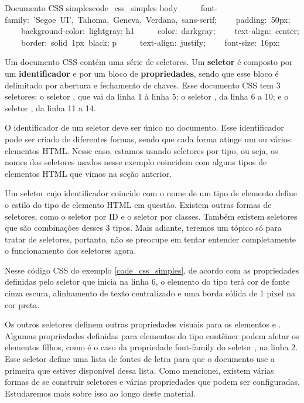 \begin{csscode}{Documento CSS simples}{code_css_simples}
body {
    font-family: 'Segoe UI', Tahoma, Geneva, Verdana, sans-serif;
    padding: 50px;
    background-color: lightgray;
}
h1 {
    color: darkgray;
    text-align: center;
    border: solid 1px black;
}
p {
    text-align: justify;
    font-size: 16px;
}
\end{csscode}

Um documento CSS contém uma série de seletores. Um \textbf{seletor} é composto por um \textbf{identificador} e por um bloco de \textbf{propriedades}, sendo que esse bloco é delimitado por abertura e fechamento de chaves. Esse documento CSS tem 3 seletores: o seletor , que vai da linha 1 à linha 5; o seletor , da linha 6 a 10; e o seletor , da linha 11 a 14.

O identificador de um seletor deve ser único no documento. Esse identificador pode ser criado de diferentes formas, sendo que cada forma atinge um ou vários elementos HTML. Nesse caso, estamos usando seletores por tipo, ou seja, os nomes dos seletores usados nesse exemplo coincidem com alguns tipos de elementos HTML que vimos na seção anterior.

Um seletor cujo identificador coincide com o nome de um tipo de elemento define o estilo do tipo de elemento HTML em questão. Existem outras formas de seletores, como o seletor por ID e o seletor por classes. Também existem seletores que são combinações desses 3 tipos. Mais adiante, teremos um tópico só para tratar de seletores, portanto, não se preocupe em tentar entender completamente o funcionamento dos seletores agora.

Nesse código CSS do exemplo \ref{code_css_simples}, de acordo com as propriedades definidas pelo seletor  que inicia na linha 6, o elemento do tipo  terá cor de fonte cinza escura, alinhamento de texto centralizado e uma borda sólida de 1 pixel na cor preta. 

Os outros seletores definem outras propriedades visuais para os elementos  e . Algumas propriedades definidas para elementos do tipo contêiner podem afetar os elementos filhos, como é o caso da propriedade font-family do seletor , na linha 2. Esse seletor define uma lista de fontes de letra para que o documento use a primeira que estiver disponível dessa lista. Como mencionei, existem várias formas de se construir seletores e várias propriedades que podem ser configuradas. Estudaremos mais sobre isso ao longo deste material.

